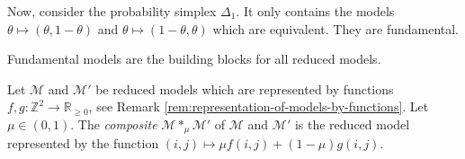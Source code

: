 \begin{example}\label{ex:prob-simplex-1}
    Now, consider the probability simplex \( \Delta_1 \). It only contains the models \( \theta \mapsto (\theta, 1-\theta) \) and \( \theta \mapsto (1-\theta, \theta) \) which are equivalent. They are fundamental.
\end{example}

Fundamental models are the building blocks for all reduced models.

\begin{definition}
    Let \( \mathcal{M} \) and \( \mathcal{M}' \) be reduced models which are represented by functions \( f,g : \mathbb{Z}^2 \to \mathbb{R}_{\geq 0} \), see Remark \ref{rem:representation-of-models-by-functions}. Let \( \mu \in (0,1) \). The \emph{composite} \( \mathcal{M} *_\mu \mathcal{M}' \) of \( \mathcal{M} \) and \( \mathcal{M}' \) is the reduced model represented by the function \(  (i,j) \mapsto \mu f(i,j) + (1-\mu) g(i,j) \).
\end{definition}





